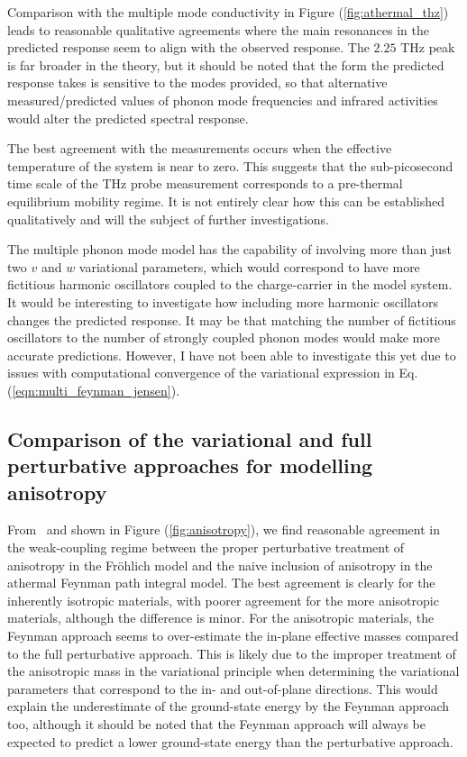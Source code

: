 Comparison with the multiple mode conductivity in Figure (\ref{fig:athermal_thz}) leads to reasonable qualitative agreements where the main resonances in the predicted response seem to align with the observed response. The $2.25$ THz peak is far broader in the theory, but it should be noted that the form the predicted response takes is sensitive to the modes provided, so that alternative measured/predicted values of phonon mode frequencies and infrared activities would alter the predicted spectral response. 

The best agreement with the measurements occurs when the effective temperature of the system is near to zero. This suggests that the sub-picosecond time scale of the THz probe measurement corresponds to a pre-thermal equilibrium mobility regime. It is not entirely clear how this can be established qualitatively and will the subject of further investigations. 

The multiple phonon mode model has the capability of involving more than just two $v$ and $w$ variational parameters, which would correspond to have more fictitious harmonic oscillators coupled to the charge-carrier in the model system. It would be interesting to investigate how including more harmonic oscillators changes the predicted response. It may be that matching the number of fictitious oscillators to the number of strongly coupled phonon modes would make more accurate predictions. However, I have not been able to investigate this yet due to issues with computational convergence of the variational expression in Eq. (\ref{eqn:multi_feynman_jensen}).

\subsection{Comparison of the variational and full perturbative approaches for modelling anisotropy}

From~\cite{guster_frohlich_2021} and shown in Figure (\ref{fig:anisotropy}), we find reasonable agreement in the weak-coupling regime between the proper perturbative treatment of anisotropy in the Fr\"ohlich model and the naive inclusion of anisotropy in the athermal Feynman path integral model. The best agreement is clearly for the inherently isotropic materials, with poorer agreement for the more anisotropic materials, although the difference is minor. For the anisotropic materials, the Feynman approach seems to over-estimate the in-plane effective masses compared to the full perturbative approach. This is likely due to the improper treatment of the anisotropic mass in the variational principle when determining the variational parameters that correspond to the in- and out-of-plane directions. This would explain the underestimate of the ground-state energy by the Feynman approach too, although it should be noted that the Feynman approach will always be expected to predict a lower ground-state energy than the perturbative approach. 

